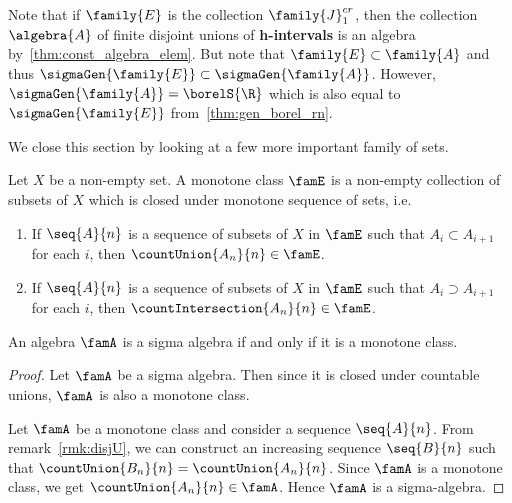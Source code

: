 \begin{Remark}\label{rmk:hinterval}
    Note that if $\family{E}$ is the collection $\family{J}^{cr}_{1}$, then the collection
    $\algebra{A}$ of finite disjoint unions of \textbf{h-intervals} is an algebra
    by~\ref{thm:const_algebra_elem}. But note that $\family{E} \subset \family{A}$ and thus
    $\sigmaGen{\family{E}} \subset \sigmaGen{\family{A}}$. However, 
    $\sigmaGen{\family{A}} = \borelS{\R}$ which is also equal to $\sigmaGen{\family{E}}$
    from~\ref{thm:gen_borel_rn}.
\end{Remark}

We close this section by looking at a few more important family of sets.
\begin{Definition}[name=Monotone Class]
    Let $X$ be a non-empty set. A monotone class $\famE$ is a non-empty collection of subsets of $X$ which is
    closed under monotone sequence of sets, i.e.
    \begin{enumerate}
	\item If $\seq{A}{n}$ is a sequence of subsets of $X$ in $\famE$ such that $A_i \subset A_{i+1}$ for
	    each $i$, then $\countUnion{A_n}{n} \in \famE$.
	\item If $\seq{A}{n}$ is a sequence of subsets of $X$ in $\famE$ such that $A_i \supset A_{i+1}$ for
	    each $i$, then $\countIntersection{A_n}{n} \in \famE$.
    \end{enumerate}
\end{Definition}
\begin{Proposition}
    An algebra $\famA$ is a sigma algebra if and only if it is a monotone class.
\end{Proposition}
\begin{proof}
    Let $\famA$ be a sigma algebra. Then since it is closed under countable unions, $\famA$ is also a
    monotone class. 

    Let $\famA$ be a monotone class and consider a sequence $\seq{A}{n}$. From remark~\ref{rmk:disjU}, we can
    construct an increasing sequence $\seq{B}{n}$ such that $\countUnion{B_n}{n} = \countUnion{A_n}{n}$. Since
    $\famA$ is a monotone class, we get $\countUnion{A_n}{n} \in \famA$. Hence $\famA$ is a sigma-algebra.
\end{proof}

